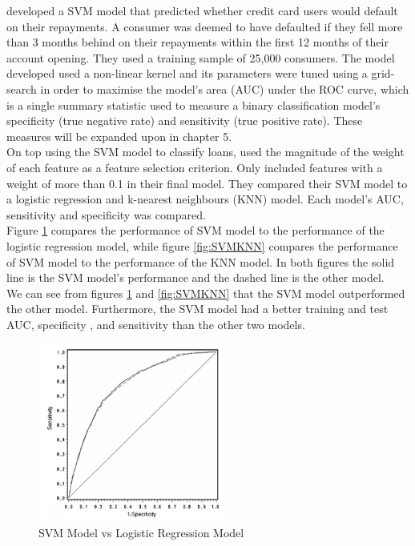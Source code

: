 \vspace{10pt}


\textcite{SVMCrook} developed a SVM model that predicted whether credit card users would default on their repayments. A consumer was deemed to have defaulted if they fell more than 3 months behind on their repayments within the first 12 months of their account opening. They used a training sample of 25,000 consumers. The model developed used a non-linear kernel and its parameters were tuned using a grid-search in order to maximise the model's area (AUC) under the ROC curve, which is a single summary statistic used to measure a binary classification model's specificity (true negative rate) and sensitivity (true positive rate). These measures will be expanded upon in chapter 5. \\

On top using the SVM model to classify loans, \textcite{SVMCrook} used the magnitude of the weight of each feature as a feature selection criterion. Only included features with a weight of more than 0.1 in their final model. They compared their SVM model to a logistic regression and k-nearest neighbours (KNN) model. Each model's AUC, sensitivity and specificity was compared. \\

Figure \ref{fig:SVMLR} compares the performance of SVM model to the performance of the logistic regression model, while figure \ref{fig:SVMKNN} compares the performance of SVM model to the performance of the KNN model. In both figures the solid line is the SVM model's performance and the dashed line is the other model. \\

We can see from figures \ref{fig:SVMLR} and \ref{fig:SVMKNN} that the SVM model outperformed the other model. Furthermore, the SVM model had a better training and test AUC, specificity , and sensitivity than the other two models. 

\vspace{10pt}

\begin{figure}[!htb]
\centering
\includegraphics[width=0.55\textwidth]{images/SVMLR.png}
\caption{SVM Model vs Logistic Regression Model}
\label{fig:SVMLR}
\end{figure}

